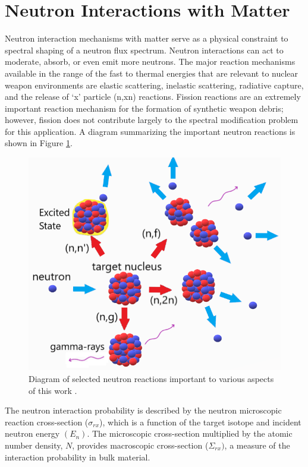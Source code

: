 \section{Neutron Interactions with Matter}

Neutron interaction mechanisms with matter serve as a physical constraint to spectral shaping of a neutron flux spectrum. 
Neutron interactions can act to moderate, absorb, or even emit more neutrons. 
The major reaction mechanisms available in the range of the fast to thermal energies that are relevant to nuclear weapon environments are elastic scattering, inelastic scattering, radiative capture, and the release of `x' particle (n,xn) reactions. 
Fission reactions are an extremely important reaction mechanism for the formation of synthetic weapon debris; however, fission does not contribute largely to the spectral modification problem for this application. 
A diagram summarizing the important neutron reactions is shown in Figure \ref{fig:rxns}.

\begin{figure}[ht]
	\includegraphics[width=\linewidth]{Figures/Chapter2/NeutronThings.png}
	\caption[Diagram of selected neutron reactions]{Diagram of selected neutron reactions important to various aspects of this work \cite{Greenwood2013}.}
	\label{fig:rxns}
\end{figure}

The neutron interaction probability is described by the neutron microscopic reaction cross-section ($\sigma_{rx}$), which is a function of the target isotope and incident neutron energy $(E_{n})$.  
The microscopic cross-section multiplied by the atomic number density, $N$, provides macroscopic cross-section ($\Sigma_{rx})$, a measure of the interaction probability in bulk material. 

